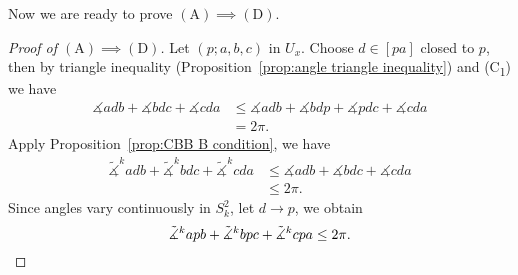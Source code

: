 Now we are ready to prove $\mathrm{(A)}\implies\mathrm{(D)}$.
\begin{proof}[Proof of $\mathrm{(A)}\implies\mathrm{(D)}$]
    Let $(p;a,b,c)$ in $U_x$.
    Choose $d\in[pa]$ closed to $p$, then by triangle inequality (Proposition~\ref{prop:angle triangle inequality}) and (C\textsubscript{1}) we have
    \begin{align*}
        \measuredangle{adb}+\measuredangle{bdc}+\measuredangle{cda}&\leq\measuredangle{adb}+\measuredangle{bdp}+\measuredangle{pdc}+\measuredangle{cda}\\
        &=2\pi.
    \end{align*}
    Apply Proposition~\ref{prop:CBB B condition}, we have
    \begin{align*}
        \tilde{\measuredangle}^kadb+\tilde{\measuredangle}^kbdc+\tilde{\measuredangle}^kcda&\leq\measuredangle{adb}+\measuredangle{bdc}+\measuredangle{cda}\\
        &\leq 2\pi.
    \end{align*}
    Since angles vary continuously in $S^2_k$, let $d\to p$, we obtain
    \[\tilde{\measuredangle}^kapb+\tilde{\measuredangle}^kbpc+\tilde{\measuredangle}^kcpa\leq 2\pi.\qedhere\]
\end{proof}